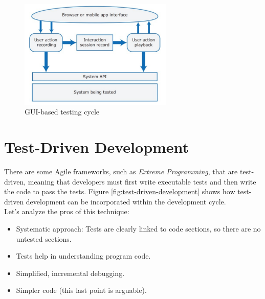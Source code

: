 \begin{figure} [H]
    \centering
    \includegraphics[width=0.65\textwidth]{images/Testing/interaction-replicater.PNG}
    \caption{GUI-based testing cycle}
    \label{fig:interaction-replicater}
\end{figure} 

\section{Test-Driven Development}

There are some Agile frameworks, such as \textit{Extreme Programming}, that are test-driven, meaning that developers must first write executable tests and then write the code to pass the tests. Figure \ref{fig:test-driven-development} shows how test-driven development can be incorporated within the development cycle. \\

\noindent Let's analyze the pros of this technique:

\begin{itemize}
    \item Systematic approach: Tests are clearly linked to code sections, so there are no untested sections.
    \item Tests help in understanding program code.
    \item Simplified, incremental debugging.
    \item Simpler code (this last point is arguable).
\end{itemize}

